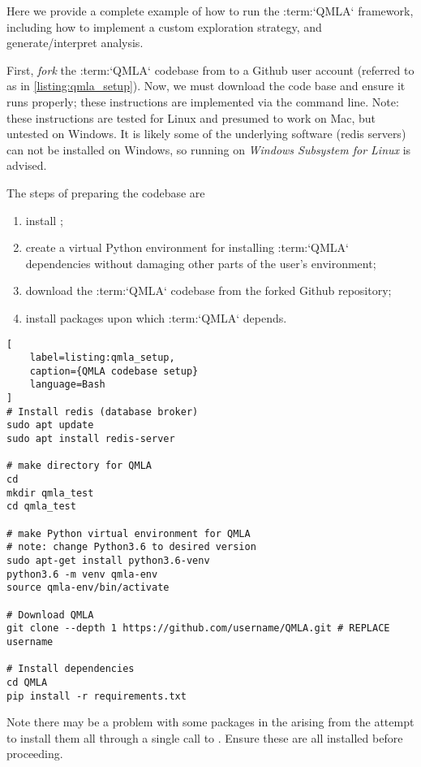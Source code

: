 Here we provide a complete example of how to run the :term:`QMLA` framework, 
    including how to implement a custom exploration strategy, 
    and generate/interpret analysis.
\par 

First, \emph{fork} the :term:`QMLA` codebase from \cite{flynn2021QMLA}
    to a Github user account (referred to as  in \cref{listing:qmla_setup}).
Now, we must download the code base and ensure it runs properly;
    these instructions are implemented via the command line\footnotemark. 
Note: these instructions are tested for Linux and presumed to work on Mac, but untested on Windows. 
    It is likely some of the underlying software (redis servers) can not be installed on Windows,
    so running on \emph{Windows Subsystem for Linux} is advised. 

The steps of preparing the codebase are 
\begin{enumerate}
\item install ;
\item create a virtual Python environment for installing :term:`QMLA` dependencies without damaging other parts of 
the user's environment;
\item  download the :term:`QMLA` codebase from the forked Github repository;
\item install packages upon which :term:`QMLA` depends. 
\end{enumerate}
    
\begin{lstlisting}[
    label=listing:qmla_setup,
    caption={QMLA codebase setup}
    language=Bash
]
# Install redis (database broker)
sudo apt update
sudo apt install redis-server
 
# make directory for QMLA
cd
mkdir qmla_test
cd qmla_test

# make Python virtual environment for QMLA
# note: change Python3.6 to desired version
sudo apt-get install python3.6-venv 
python3.6 -m venv qmla-env    
source qmla-env/bin/activate

# Download QMLA
git clone --depth 1 https://github.com/username/QMLA.git # REPLACE username

# Install dependencies
cd QMLA 
pip install -r requirements.txt 
\end{lstlisting}

Note there may be a problem with some packages in the  arising from the attempt to install them all through
a single call to . 
Ensure these are all installed before proceeding. 
\par 

